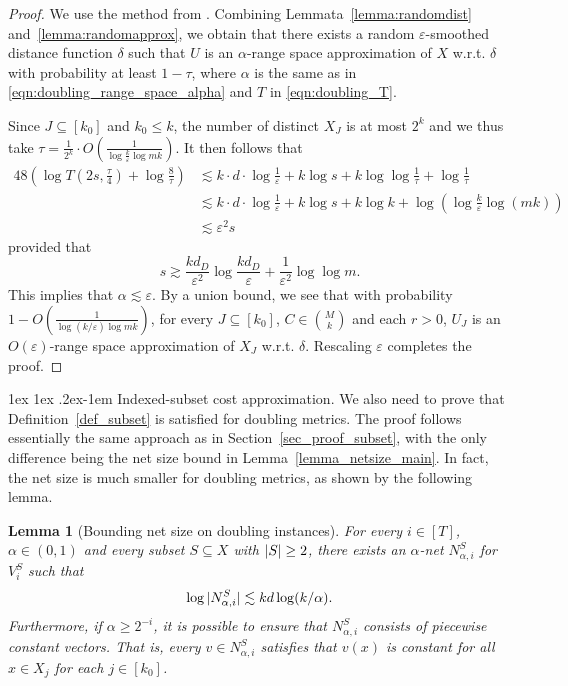 \documentclass[11pt,letterpaper]{article}
\makeatletter
\renewcommand{\paragraph}{%
  \@startsection{paragraph}{4}%
  {\z@}{1ex \@plus 1ex \@minus .2ex}{-1em}%
  {\normalfont\normalsize\bfseries}%
}
\newtheorem{lemma}[theorem]{Lemma}
\theoremstyle{definition}
\newcommand{\eps}{\varepsilon}
\DeclarePairedDelimiter{\abs}{\lvert}{\rvert}
\makeatother
\begin{document}
\begin{proof}
We use the method from \cite[Lemma 3.1]{huang2018epsilon}. 
Combining Lemmata~\ref{lemma:randomdist} and~\ref{lemma:randomapprox}, we obtain that there exists a random $\eps$-smoothed distance function $\delta$ such that 
$U$ is an $\alpha$-range space approximation of $X$ w.r.t. $\delta$ with probability at least $1-\tau$, where $\alpha$ is the same as in \eqref{eqn:doubling_range_space_alpha} and $T$ in \eqref{eqn:doubling_T}.

Since $J\subseteq [k_0]$ and $k_0\leq k$, the number of distinct $X_J$ is at most $2^k$ and we thus take $\tau=\frac{1}{2^k}\cdot O(\frac{1}{\log{\frac{k}{\eps}\log{mk}}})$. It then follows that 
\begin{align*}
    48(\log{T(2s,\frac{\tau}{4})} + \log{\frac{8}{\tau}})
    &\lesssim k\cdot d \cdot \log\frac{1}{\eps} + k\log s + k \log\log\frac{1}{\tau} + \log\frac{1}{\tau} \\
    &\lesssim k\cdot d \cdot \log\frac{1}{\eps} + k\log s + k\log k + \log\left(\log\frac{k}{\eps}\log(mk)\right)\\
    &\lesssim \eps^2 s
\end{align*}
provided that 
\[
    s \gtrsim \frac{kd_{D}}{\eps^2} \log \frac{kd_{D}}{\eps} + \frac{1}{\eps^2}\log \log m.
\]
This implies that $\alpha \lesssim \eps$. By a union bound, we see that with probability $1-O(\frac{1}{\log(k/\eps)\log{mk}})$, for every $J\subseteq [k_0]$, $C\in \binom{M}{k}$ and each $r>0$, $U_J$ is an $O(\eps)$-range space approximation of $X_J$ w.r.t. $\delta$. Rescaling $\eps$ completes the proof.
\end{proof}


\paragraph{Indexed-subset cost approximation.} We also need to prove that Definition~\ref{def_subset} is satisfied for doubling metrics. The proof follows essentially the same approach as in Section~\ref{sec_proof_subset}, with the only difference being the net size bound in Lemma~\ref{lemma_netsize_main}. In fact, the net size is much smaller for doubling metrics, as shown by the following lemma.

\begin{lemma}[Bounding net size on doubling instances] \label{lemma_netsize_doubling}
    For every $i\in [T]$, $\alpha\in (0,1)$ and every subset $S\subseteq X $ with $\abs{S}\geq 2$, there exists an $\alpha$-net $N_{\alpha,i}^{S}$ for $V_{i}^S$ such that
    \[
        \log {\abs{N_{\alpha,i}^S}}\lesssim k d \log (k/\alpha).
    \]
    Furthermore, if $\alpha \geq 2^{-i}$, it is possible to ensure that $N_{\alpha,i}^S$ consists of piecewise constant vectors. That is, every $v\in N_{\alpha,i}^S$ satisfies that $v(x)$ is constant for all $x\in X_j$ for each $j\in [k_0]$.
\end{lemma}
\end{document}
